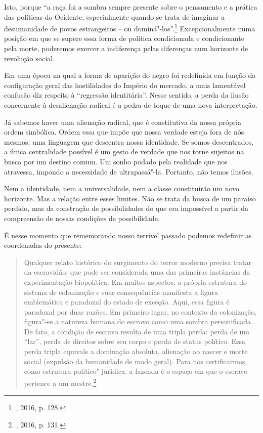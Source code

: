 Isto, porque ``a raça foi a sombra sempre presente sobre o pensamento e
a prática das políticas do Ocidente, especialmente quando se trata de
imaginar a desumanidade de povos estrangeiros -- ou
dominá"-los''.\footnote{, 2016, p. 128.} Excepcionalmente numa
posição em que se supere essa forma de política condicionada e
condicionante pela morte, poderemos exercer a indiferença pelas
diferenças num horizonte de revolução social.

Em uma época na qual a forma de aparição do negro foi redefinida em
função da configuração geral das hostilidades do Império do mercado, a
mais lamentável confusão diz respeito à ``regressão identitária''. Nesse
sentido, a perda da ilusão concernente à desalienação radical é a pedra
de toque de uma nova interpretação.

Já sabemos haver uma alienação radical, que é constitutiva da nossa
própria ordem simbólica. Ordem essa que impõe que nossa verdade esteja
fora de nós mesmos; uma linguagem que descentra nossa identidade. Se
somos descentrados, a única centralidade possível é um gesto de verdade
que nos torne sujeitos na busca por um destino comum. Um sonho podado
pela realidade que nos atravessa, impondo a necessidade de
ultrapassá"-la. Portanto, não temos ilusões.

Nem a identidade, nem a universalidade, nem a classe constituirão um
novo horizonte. Mas a relação entre esses limites. Não se trata da busca
de um paraíso perdido, mas da construção de possibilidades do que era
impossível a partir da compreensão de nossas condições de possibilidade.

É nesse momento que rememorando nosso terrível passado podemos redefinir
as coordenadas do presente:

\begin{quote}
Qualquer relato histórico do surgimento do terror moderno precisa tratar
da escravidão, que pode ser considerada uma das primeiras instâncias da
experimentação biopolítica. Em muitos aspectos, a própria estrutura do
sistema de colonização e suas consequências manifesta a figura
emblemática e paradoxal do estado de exceção. Aqui, essa figura é
paradoxal por duas razões. Em primeiro lugar, no contexto da
colonização, figura"-se a natureza humana do escravo como uma sombra
personificada. De fato, a condição de escravo resulta de uma tripla
perda: perda de um ``lar'', perda de direitos sobre seu corpo e perda de
status político. Essa perda tripla equivale a dominação absoluta,
alienação ao nascer e morte social (expulsão da humanidade de modo
geral). Para nos certificarmos, como estrutura político"-jurídica, a
fazenda é o espaço em que o escravo pertence a um mestre.\footnote{,
  2016, p. 131.}
\end{quote}

